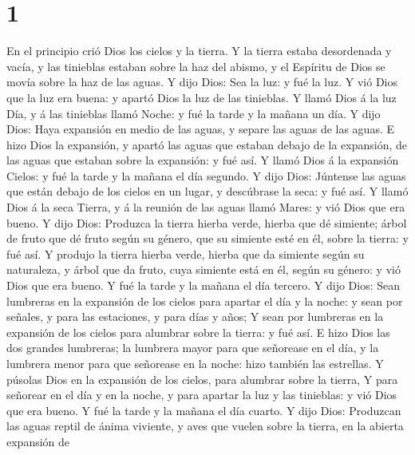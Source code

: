 \hypertarget{section}{%
\section{1}\label{section}}

 En el principio crió Dios los cielos y la tierra.
 Y la tierra estaba desordenada y vacía, y las tinieblas
estaban sobre la haz del abismo, y el Espíritu de Dios se movía sobre la
haz de las aguas.  Y dijo Dios: Sea la luz: y fué la luz.
 Y vió Dios que la luz era buena: y apartó Dios la luz de
las tinieblas.  Y llamó Dios á la luz Día, y á las
tinieblas llamó Noche: y fué la tarde y la mañana un día. 
Y dijo Dios: Haya expansión en medio de las aguas, y separe las aguas de
las aguas.  E hizo Dios la expansión, y apartó las aguas
que estaban debajo de la expansión, de las aguas que estaban sobre la
expansión: y fué así.  Y llamó Dios á la expansión Cielos:
y fué la tarde y la mañana el día segundo.  Y dijo Dios:
Júntense las aguas que están debajo de los cielos en un lugar, y
descúbrase la seca: y fué así.  Y llamó Dios á la seca
Tierra, y á la reunión de las aguas llamó Mares: y vió Dios que era
bueno.  Y dijo Dios: Produzca la tierra hierba verde,
hierba que dé simiente; árbol de fruto que dé fruto según su género, que
su simiente esté en él, sobre la tierra: y fué así.  Y
produjo la tierra hierba verde, hierba que da simiente según su
naturaleza, y árbol que da fruto, cuya simiente está en él, según su
género: y vió Dios que era bueno.  Y fué la tarde y la
mañana el día tercero.  Y dijo Dios: Sean lumbreras en la
expansión de los cielos para apartar el día y la noche: y sean por
señales, y para las estaciones, y para días y años;  Y
sean por lumbreras en la expansión de los cielos para alumbrar sobre la
tierra: y fué así.  E hizo Dios las dos grandes
lumbreras; la lumbrera mayor para que señorease en el día, y la lumbrera
menor para que señorease en la noche: hizo también las estrellas.
 Y púsolas Dios en la expansión de los cielos, para
alumbrar sobre la tierra,  Y para señorear en el día y en
la noche, y para apartar la luz y las tinieblas: y vió Dios que era
bueno.  Y fué la tarde y la mañana el día cuarto.
 Y dijo Dios: Produzcan las aguas reptil de ánima
viviente, y aves que vuelen sobre la tierra, en la abierta expansión de
